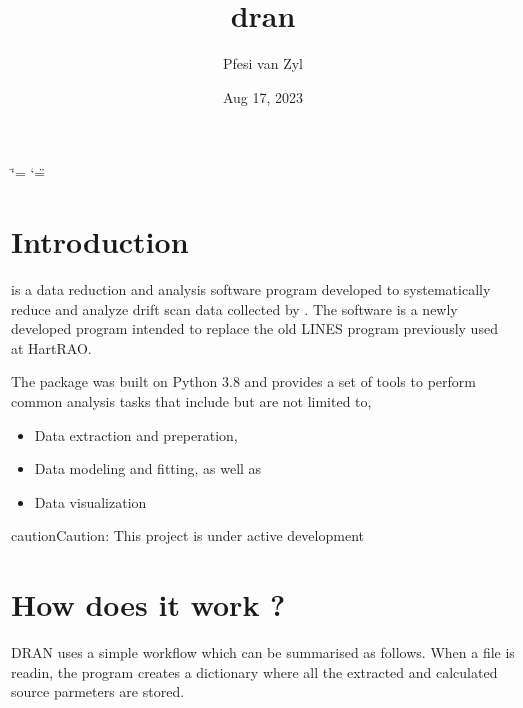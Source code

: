 \documentclass[letterpaper,10pt,english]{sphinxmanual}
\title{dran}
\date{Aug 17, 2023}
\author{Pfesi van Zyl}
\begin{document}
\ifdefined\shorthandoff
  \ifnum\catcode`\=\string=\active\shorthandoff{=}\fi
  \ifnum\catcode`\"=\active{}\fi
\fi

\pagestyle{empty}
\sphinxmaketitle
\pagestyle{plain}
\sphinxtableofcontents
\pagestyle{normal}
\label{\detokenize{index::doc}}



\chapter{Introduction}
\label{\detokenize{index:introduction}}
\sphinxAtStartPar
{} is a data reduction and analysis software program developed to systematically reduce and analyze
 drift scan data collected
by .
The software is a newly developed program intended to replace the old LINES program previously used at HartRAO.

\sphinxAtStartPar
The package was built on Python 3.8 and provides
a set of tools to perform common analysis tasks that
include but are not limited to,
\begin{itemize}
\item {} 
\sphinxAtStartPar
Data extraction and preperation,

\item {} 
\sphinxAtStartPar
Data modeling and fitting, as well as

\item {} 
\sphinxAtStartPar
Data visualization

\end{itemize}

\begin{sphinxadmonition}{caution}{Caution:}
\sphinxAtStartPar
This project is under active development
\end{sphinxadmonition}


\chapter{How does it work ?}
\label{\detokenize{index:how-does-it-work}}
\sphinxAtStartPar
DRAN uses a simple workflow which can be summarised as follows.
When a file is read\sphinxhyphen{}in, the program creates a dictionary where
all the extracted and calculated source parmeters are stored.
\end{document}
